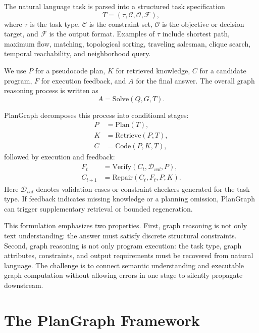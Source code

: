 \documentclass[pdflatex,iicol,sn-mathphys-num]{sn-jnl}
\theoremstyle{thmstyleone}
\theoremstyle{thmstyletwo}
\theoremstyle{thmstylethree}
\begin{document}
The natural language task is parsed into a structured task specification
\begin{equation}
T=(\tau,\mathcal{C},\mathcal{O},\mathcal{F}),
\end{equation}
where $\tau$ is the task type, $\mathcal{C}$ is the constraint set, $\mathcal{O}$ is the objective or decision target, and $\mathcal{F}$ is the output format. Examples of $\tau$ include shortest path, maximum flow, matching, topological sorting, traveling salesman, clique search, temporal reachability, and neighborhood query.

We use $P$ for a pseudocode plan, $K$ for retrieved knowledge, $C$ for a candidate program, $F$ for execution feedback, and $A$ for the final answer. The overall graph reasoning process is written as
\begin{equation}
A = \mathrm{Solve}(Q,G,T).
\end{equation}

PlanGraph decomposes this process into conditional stages:
\begin{align}
P &= \mathrm{Plan}(T), \nonumber\\
K &= \mathrm{Retrieve}(P,T), \nonumber\\
C &= \mathrm{Code}(P,K,T),
\end{align}
followed by execution and feedback:
\begin{align}
F_t &= \mathrm{Verify}(C_t,\mathcal{D}_{val},P), \nonumber\\
C_{t+1} &= \mathrm{Repair}(C_t,F_t,P,K).
\end{align}
Here $\mathcal{D}_{val}$ denotes validation cases or constraint checkers generated for the task type. If feedback indicates missing knowledge or a planning omission, PlanGraph can trigger supplementary retrieval or bounded regeneration.

This formulation emphasizes two properties. First, graph reasoning is not only text understanding: the answer must satisfy discrete structural constraints. Second, graph reasoning is not only program execution: the task type, graph attributes, constraints, and output requirements must be recovered from natural language. The challenge is to connect semantic understanding and executable graph computation without allowing errors in one stage to silently propagate downstream.

\section{The PlanGraph Framework}\label{sec:framework}
\end{document}
